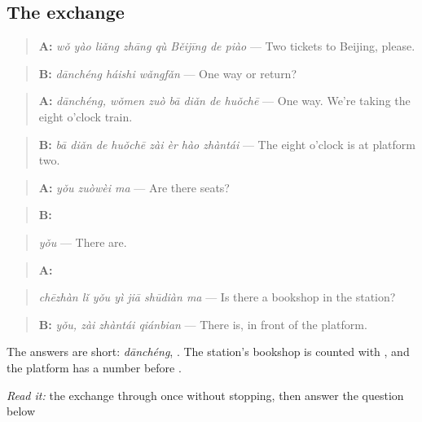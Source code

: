 \subsection*{The exchange}
\begin{quote}
\textbf{A:} \emph{wǒ yào liǎng zhāng qù Běijīng de piào} — Two tickets to Beijing, please.
\end{quote}

\begin{quote}
\textbf{B:} \emph{dānchéng háishi wǎngfǎn} — One way or return?
\end{quote}

\begin{quote}
\textbf{A:} \emph{dānchéng, wǒmen zuò bā diǎn de huǒchē} — One way. We're taking the eight o'clock train.
\end{quote}

\begin{quote}
\textbf{B:} \emph{bā diǎn de huǒchē zài èr hào zhàntái} — The eight o'clock is at platform two.
\end{quote}

\begin{quote}
\textbf{A:} \emph{yǒu zuòwèi ma} — Are there seats?
\end{quote}

\begin{quote}
\textbf{B:} 
\end{quote}

\begin{quote}
\emph{yǒu} — There are.
\end{quote}

\begin{quote}
\textbf{A:} 
\end{quote}

\begin{quote}
\emph{chēzhàn lǐ yǒu yì jiā shūdiàn ma} — Is there a bookshop in the station?
\end{quote}

\begin{quote}
\textbf{B:} \emph{yǒu, zài zhàntái qiánbian} — There is, in front of the platform.
\end{quote}

The answers are short: \emph{dānchéng}, . The station's bookshop is counted with , and the platform has a number before .

\begin{tcolorbox}[breakable,skin=enhanced,colback=orange!6,colframe=orange!45!black,boxrule=0.5pt,arc=1mm,left=6pt,right=6pt,top=4pt,bottom=4pt,fonttitle=\bfseries,title={Read this}]
\emph{Read it:} the exchange through once without stopping, then answer the question below
\end{tcolorbox}

